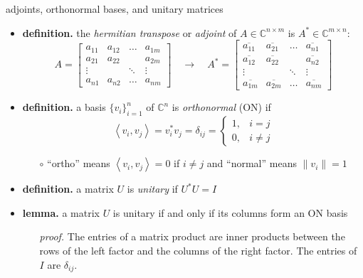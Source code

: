 \documentclass[10pt,hyperref]{beamer}
\newcommand{\CC}{\mathbb{C}}
\newcommand{\ip}[2]{\left<#1,#2\right>}
\begin{document}
\begin{frame}{adjoints, orthonormal bases, and unitary matrices}

\begin{itemize}
\item \textbf{definition.} the \emph{hermitian transpose} or \emph{adjoint} of $A\in \CC^{n\times m}$ is $A^* \in \CC^{m\times n}$:
    $$A = \begin{bmatrix}
    a_{11} & a_{12} & \dots & a_{1m} \\
    a_{21} & a_{22} &       & a_{2m} \\
    \vdots &        & \ddots& \vdots \\
    a_{n1} & a_{n2} & \dots & a_{nm} \end{bmatrix}
    \quad \to \quad
    A^* = \begin{bmatrix}
    \overline{a_{11}} & \overline{a_{21}} & \dots & \overline{a_{n1}} \\
    \overline{a_{12}} & \overline{a_{22}} &       & \overline{a_{n2}} \\
    \vdots            &                   & \ddots& \vdots \\
    \overline{a_{1m}} & \overline{a_{2m}} & \dots & \overline{a_{nm}} \end{bmatrix}$$
\item \textbf{definition.} a basis $\{v_i\}_{i=1}^n$ of $\CC^n$ is \emph{orthonormal} (ON) if
\small
    $$\ip{v_i}{v_j} =v_i^* v_j = \delta_{ij} = \begin{cases} 1, & i=j \\ 0, & i\ne j \end{cases}$$
\normalsize
\vspace{-2mm}
    \begin{itemize}
    \item[$\circ$] ``ortho'' means $\ip{v_i}{v_j}=0$ if $i\ne j$ and ``normal'' means $\|v_i\|=1$
    \end{itemize}
\item \textbf{definition.} a matrix $U$ is \emph{unitary} if $U^* U = I$
\item \textbf{lemma.} a matrix $U$ is unitary if and only if its columns form an ON basis
    \begin{itemize}
    \item[\emph{proof.}] The entries of a matrix product are inner products between the rows of the left factor and the columns of the right factor.  The entries of $I$ are $\delta_{ij}$.
    \end{itemize}
\end{itemize}
\end{frame}
\end{document}
